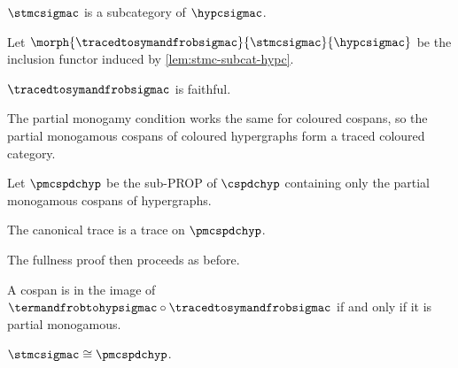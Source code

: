 \begin{lemma}\label{lem:stmc-subcat-hypc}
    \(\stmcsigmac\) is a subcategory of \(\hypcsigmac\).
\end{lemma}

\begin{definition}
    Let \(\morph{\tracedtosymandfrobsigmac}{\stmcsigmac}{\hypcsigmac}\) be the
    inclusion functor induced by \cref{lem:stmc-subcat-hypc}.
\end{definition}

\begin{corollary}
    \(\tracedtosymandfrobsigmac\) is faithful.
\end{corollary}

The partial monogamy condition works the same for coloured cospans, so
the partial monogamous cospans of coloured hypergraphs form a traced coloured
category.

\begin{definition}
    Let \(\pmcspdchyp\) be the sub-PROP of \(\cspdchyp\) containing only the
    partial monogamous cospans of hypergraphs.
\end{definition}

\begin{theorem}
    The canonical trace is a trace on \(\pmcspdchyp\).
\end{theorem}

The fullness proof then proceeds as before.

\begin{theorem}
    A cospan is in the image of
    \(\termandfrobtohypsigmac \circ \tracedtosymandfrobsigmac\) if and only if
    it is partial monogamous.
\end{theorem}

\begin{corollary}
    \(\stmcsigmac \cong \pmcspdchyp\).
\end{corollary}